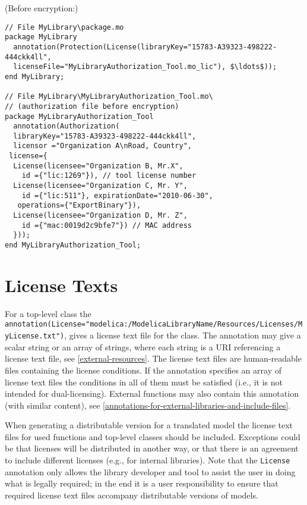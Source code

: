 \begin{example}
(Before encryption:)
\begin{lstlisting}[language=modelica]
// File MyLibrary\package.mo
package MyLibrary
  annotation(Protection(License(libraryKey="15783-A39323-498222-444ckk4ll",
  licenseFile="MyLibraryAuthorization_Tool.mo_lic"), $\ldots$));
end MyLibrary;

// File MyLibrary\MyLibraryAuthorization_Tool.mo\
// (authorization file before encryption)
package MyLibraryAuthorization_Tool
  annotation(Authorization(
  libraryKey="15783-A39323-498222-444ckk4ll",
  licensor ="Organization A\nRoad, Country",
 license={
  License(licensee="Organization B, Mr.X",
    id ={"lic:1269"}), // tool license number
  License(licensee="Organization C, Mr. Y",
    id ={"lic:511"}, expirationDate="2010-06-30",
   operations={"ExportBinary"}),
  License(licensee="Organization D, Mr. Z",
    id ={"mac:0019d2c9bfe7"}) // MAC address
  }));
end MyLibraryAuthorization_Tool;
\end{lstlisting}
\end{example}


\section{License Texts}\label{license-texts}

For a top-level class the {\lstinline!annotation(License="modelica:/ModelicaLibraryName/Resources/Licenses/MyLicense.txt")!}, gives a license text file for the class.
The annotation may give a scalar string or an array of strings, where each string is a URI referencing a license text file, see \cref{external-resources}.
The license text files are human-readable files containing the license conditions.
If the annotation specifies an array of license text files the conditions in all of them must be satisfied (i.e., it is not intended for dual-licensing).
External functions may also contain this annotation (with similar content), see \cref{annotations-for-external-libraries-and-include-files}.

When generating a distributable version for a translated model the license text files for used functions and top-level classes should be included.
Exceptions could be that licenses will be distributed in another way, or that there is an agreement to include different licenses (e.g., for internal libraries).
Note that the \lstinline!License! annotation only allows the library developer and tool to assist the user in doing what is legally required; in the end it is a user responsibility to ensure that required license text files accompany distributable versions of models.


